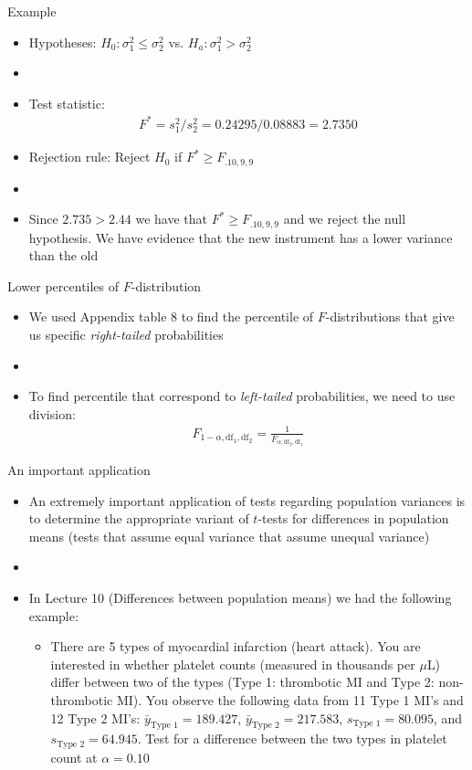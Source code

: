 \documentclass[xcolor=dvipsnames]{beamer}
\begin{document}
\begin{frame}{Example}
	\begin{itemize}
		\item Hypotheses: $H_0: \sigma_1^2 \leq \sigma_2^2$ vs. $H_a: \sigma_1^2 > \sigma_2^2$
		\item[]
		\item Test statistic:
		\begin{gather*}
		F^* = s_1^2 /s_2^2 = 0.24295 /  0.08883 = 2.7350
		\end{gather*}
		\item Rejection rule: Reject $H_0$ if $F^* \geq F_{.10, 9, 9}$
		\item[]
		\item Since $2.735 > 2.44$ we have that $F^* \geq F_{.10, 9, 9}$ and we reject the null hypothesis. We have evidence that the new instrument has a lower variance than the old
	\end{itemize}
\end{frame}

\begin{frame}{Lower percentiles of $F$-distribution}
	\begin{itemize}
		\item We used Appendix table 8 to find the percentile of $F$-distributions that give us specific \emph{right-tailed} probabilities
		\item[]
		\item To find percentile that correspond to \emph{left-tailed} probabilities, we need to use division:
		\begin{gather*}
			F_{1-\alpha, \text{df}_1, \text{df}_2} = \frac{1}{F_{\alpha, \text{df}_2, \text{df}_1}}
		\end{gather*} 
	\end{itemize}
\end{frame}

\begin{frame}{An important application}
	\begin{itemize}
		\item An extremely important application of tests regarding population variances is to determine the appropriate variant of $t$-tests for differences in population means (tests that assume equal variance that assume unequal variance)
		\item[]
		\item In Lecture 10 (Differences between population means) we had the following example: 
		\begin{itemize}
			\item There are 5 types of myocardial infarction (heart attack). You are interested in whether platelet counts (measured in thousands per $\mu$L) differ between two of the types (Type 1: thrombotic MI and Type 2: non-thrombotic MI). You observe the following data from 11 Type 1 MI's and 12 Type 2 MI's: $\bar{y}_{\text{Type 1}}=189.427$, $\bar{y}_{\text{Type 2}}=217.583$, $s_{\text{Type 1}} = 80.095$, and $s_{\text{Type 2}} = 64.945$. Test for a difference between the two types in platelet count at $\alpha = 0.10$
		\end{itemize}
	\end{itemize}
\end{frame}
\end{document}
